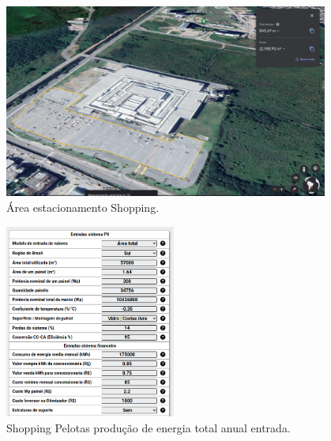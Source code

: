 \documentclass{beamer}
\begin{document}
\begin{frame}

\begin{figure}[H]
    \centering
    \includegraphics[width=0.95\textwidth]{./Figuras/shopping_2.png}
    \caption{Área estacionamento Shopping.}
   \label{fig:shopping_2}
\end{figure}

\end{frame}

\begin{frame}

\begin{figure}[H]
    \centering
    \includegraphics[width=0.5\textwidth]{./Figuras/shopping_3.png}
    \caption{Shopping Pelotas produção de energia total anual entrada.}
   \label{fig:shopping_3}
\end{figure}

\end{frame}
\end{document}
